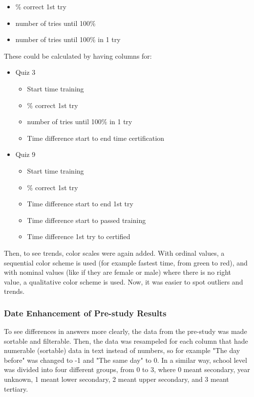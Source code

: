 \begin{itemize}
\item \% correct 1st try
\item number of tries until 100\%
\item number of tries until 100\% in 1 try
\end{itemize}

These could be calculated by having columns for:

\begin{itemize}
  \item Quiz 3
  \begin{itemize}
    \item Start time training
    \item \% correct 1st try
    \item number of tries until 100\% in 1 try
    \item Time difference start to end time certification
  \end{itemize}
  \item Quiz 9
  \begin{itemize}
    \item Start time training
    \item \% correct 1st try
    \item Time difference start to end 1st try
    \item Time difference start to passed training
    \item Time difference 1st try to certified
  \end{itemize}
\end{itemize}

Then, to see trends, color scales were again added. With ordinal values, a sequential color scheme is used (for example fastest time, from green to red), and with nominal values (like if they are female or male) where there is no right value, a qualitative color scheme is used. Now, it was easier to spot outliers and trends.

\subsubsection{Date Enhancement of Pre-study Results}
To see differences in answers more clearly, the data from the pre-study was made sortable and filterable. Then, the data was resampeled for each column that hade numerable (sortable) data in text instead of numbers, so for example "The day before" was changed to -1 and "The same day" to 0. In a similar way, school level was divided into four different groups, from 0 to 3, where 0 meant secondary, year unknown, 1 meant lower secondary, 2 meant upper secondary, and 3 meant tertiary.

